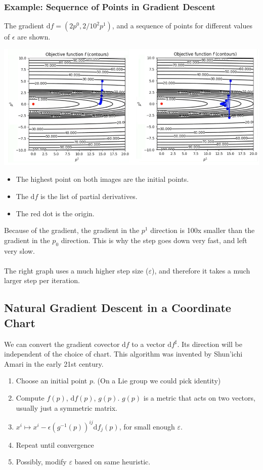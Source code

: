 \documentclass[10pt]{article}
\newcommand{\dd}{\text{d}}
\begin{document}
\subsubsection*{Example: Sequernce of Points in Gradient Descent}
The gradient $\dd f = (2p^0, 2/10^2 p^1)$, and a sequence of points for different values of $\epsilon$ are shown.
\begin{center} 
	\includegraphics*[width=\textwidth]{W8_4.png} 
\end{center}
\begin{itemize}
	\item The highest point on both images are the initial points.
	\item The $\dd f$ is the list of partial derivatives.
	\item The red dot is the origin.
\end{itemize}
Because of the gradient, the gradient in the $p^1$ direction is 100x smaller than the gradient in the $p_0$ direction.  This is why the step goes down very fast, and left very slow.\\\\
The right graph uses a much higher step size ($\varepsilon$), and therefore it takes a much larger step per iteration.

\subsection*{Natural Gradient Descent in a Coordinate Chart}
We can convert the gradient covector $\dd f$ to a vector $\dd f^\sharp$.  Its direction will be independent of the choice of chart.  This algorithm was invented by Shun'ichi Amari in the early 21st century.
\begin{enumerate}
    \item Choose an initial point $p$.  (On a Lie group we could pick identity)
    \item Compute $f(p)$, $\dd f(p)$, $g(p)$.  $g(p)$ is a metric that acts on two vectors, usually just a symmetric matrix.
    \item $x^i \mapsto x^i - \epsilon(g^{-1}(p))^{ij} \dd f_j(p)$, for small enough $\varepsilon$.
    \item Repeat until convergence
    \item Possibly, modify $\varepsilon$ based on same heuristic.
\end{enumerate}
\end{document}
